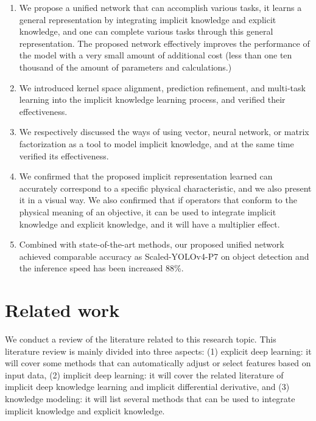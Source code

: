 \documentclass[10pt,twocolumn,letterpaper]{article}
\begin{document}
\begin{enumerate}
	\item We propose a unified network that can accomplish various tasks, it learns a general representation by integrating implicit knowledge and explicit knowledge, and one can complete various tasks through this general representation. The proposed network effectively improves the performance of the model with a very small amount of additional cost (less than one ten thousand of the amount of parameters and calculations.)
	\vspace{-2mm}
	\item We introduced kernel space alignment, prediction refinement, and multi-task learning into the implicit knowledge learning process, and verified their effectiveness.
	\vspace{-2mm}
	\item We respectively discussed the ways of using vector, neural network, or matrix factorization as a tool to model implicit knowledge, and at the same time verified its effectiveness.
	\vspace{-2mm}
	\item We confirmed that the proposed implicit representation learned can accurately correspond to a specific physical characteristic, and we also present it in a visual way. We also confirmed that if operators that conform to the physical meaning of an objective, it can be used to integrate implicit knowledge and explicit knowledge, and it will have a multiplier effect.
	\vspace{-2mm}
	\item Combined with state-of-the-art methods, our proposed unified network achieved comparable accuracy as Scaled-YOLOv4-P7 \cite{wang2020scaled} on object detection and the inference speed has been increased 88\%. 
	\vspace{-2mm}
\end{enumerate}


\section{Related work}

We conduct a review of the literature related to this research topic. This literature review is mainly divided into three aspects: (1) explicit deep learning: it will cover some methods that can automatically adjust or select features based on input data, (2) implicit deep learning: it will cover the related literature of implicit deep knowledge learning and implicit differential derivative, and (3) knowledge modeling: it will list several methods that can be used to integrate implicit knowledge and explicit knowledge.
\end{document}
